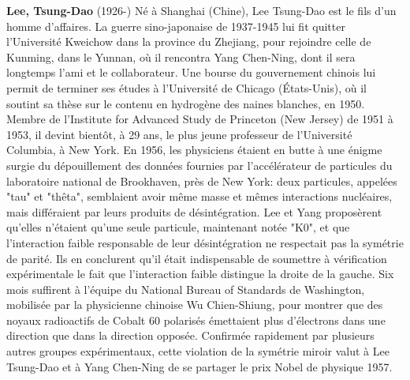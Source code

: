 \textbf{Lee, Tsung-Dao} (1926-) Né à Shanghai (Chine), Lee Tsung-Dao est le fils d'un homme d'affaires. La guerre sino-japonaise de 1937-1945 lui fit quitter l'Université Kweichow dans la province du Zhejiang, pour rejoindre celle de Kunming, dans le Yunnan, où il rencontra Yang Chen-Ning, dont il sera longtemps l'ami et le collaborateur. Une bourse du gouvernement chinois lui permit de terminer ses études à l'Université de Chicago (États-Unis), où il soutint sa thèse sur le contenu en hydrogène des naines blanches, en 1950. Membre de l'Institute for Advanced Study de Princeton (New Jersey) de 1951 à 1953, il devint bientôt, à 29 ans, le plus jeune professeur de l'Université Columbia, à New York.  En 1956, les physiciens étaient en butte à une énigme surgie du dépouillement des données fournies par l'accélérateur de particules du laboratoire national de Brookhaven, près de New York: deux particules, appelées "tau" et "thêta", semblaient avoir même masse et mêmes interactions nucléaires, mais différaient par leurs produits de désintégration. Lee et Yang proposèrent qu'elles n'étaient qu'une seule particule, maintenant notée "K0", et que l'interaction faible responsable de leur désintégration ne respectait pas la symétrie de parité. Ils en conclurent qu'il était indispensable de soumettre à vérification expérimentale le fait que l'interaction faible distingue la droite de la gauche. Six mois suffirent à l'équipe du National Bureau of Standards de Washington, mobilisée par la physicienne chinoise Wu Chien-Shiung, pour montrer que des noyaux radioactifs de Cobalt 60 polarisés émettaient plus d'électrons dans une direction que dans la direction opposée. Confirmée rapidement par plusieurs autres groupes expérimentaux, cette violation de la symétrie miroir valut à Lee Tsung-Dao et à Yang Chen-Ning de se partager le prix Nobel de physique 1957.

